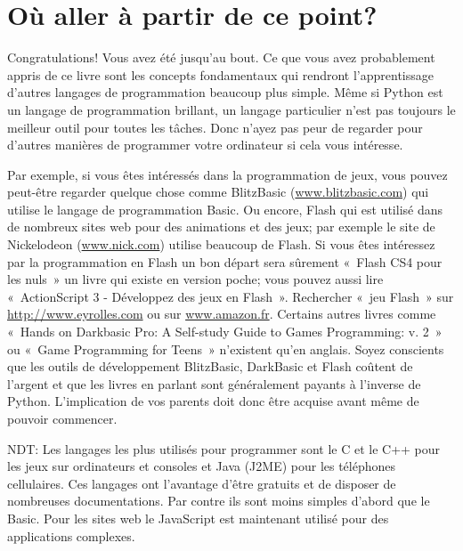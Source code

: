 


\chapter{Où aller à partir de ce point?}

Congratulations! Vous avez été jusqu'au bout. Ce que vous avez probablement appris de ce livre sont les concepts fondamentaux qui rendront l'apprentissage d'autres langages de programmation beaucoup plus simple. Même si Python est un langage de programmation brillant, un langage particulier n'est pas toujours le meilleur outil pour toutes les tâches. Donc n'ayez pas peur de regarder pour d'autres manières de programmer votre ordinateur si cela vous intéresse.

Par exemple, si vous êtes intéressés dans la programmation de jeux, vous pouvez peut-être regarder quelque chose comme BlitzBasic (\url{www.blitzbasic.com}) qui utilise le langage de programmation Basic. Ou encore, Flash qui est utilisé dans de nombreux sites web pour des animations et des jeux; par exemple le site de Nickelodeon (\url{www.nick.com}) utilise  beaucoup de Flash. Si vous êtes intéressez par la programmation en Flash un bon départ sera sûrement « Flash CS4 pour les nuls » un livre qui existe en version poche; vous pouvez aussi lire « ActionScript 3 - Développez des jeux en Flash ». Rechercher « jeu Flash » sur \url{http://www.eyrolles.com} ou sur \url{www.amazon.fr}. Certains autres livres comme « Hands on Darkbasic Pro: A Self-study Guide to Games Programming: v. 2 » ou « Game Programming for Teens » n'existent qu'en anglais.
Soyez conscients que les outils de développement BlitzBasic, DarkBasic et Flash coûtent de l'argent et que les livres en parlant sont généralement payants à l'inverse de Python. L'implication de vos parents doit donc être acquise avant même de pouvoir commencer.

NDT: Les langages les plus utilisés pour programmer sont le C et le C++ pour les jeux sur ordinateurs et consoles et Java (J2ME) pour les téléphones cellulaires. Ces langages ont l'avantage d'être gratuits et de disposer de nombreuses documentations. Par contre ils sont moins simples d'abord que le Basic. Pour les sites web le JavaScript est maintenant utilisé pour des applications complexes.

